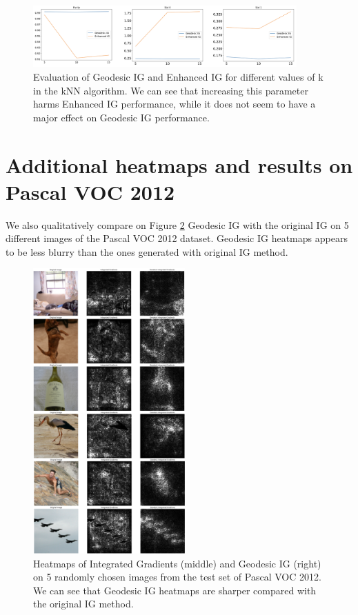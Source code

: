 \begin{figure}[ht]
\vskip 0.2in
\begin{center}
\centerline{\includegraphics[width=0.9\textwidth]{figures/knn.png}}
\caption{Evaluation of Geodesic IG and Enhanced IG for different values of k in the kNN algorithm. We can see that increasing this parameter harms Enhanced IG performance, while it does not seem to have a major effect on Geodesic IG performance.}
\label{fig:knn}
\end{center}
\vskip -0.2in
\end{figure}

\newpage

\section{Additional heatmaps and results on Pascal VOC 2012}
\label{app:voc}

We also qualitatively compare on Figure \ref{fig:more_images} Geodesic IG with the original IG on 5 different images of the Pascal VOC 2012 dataset. Geodesic IG heatmaps appears to be less blurry than the ones generated with original IG method.

\begin{figure}[ht]
\vskip 0.2in
\begin{center}
\centerline{\includegraphics[width=0.52\textwidth]{figures/more_images.png}}
\caption{Heatmaps of Integrated Gradients (middle) and Geodesic IG (right) on 5 randomly chosen images from the test set of Pascal VOC 2012. We can see that Geodesic IG heatmaps are sharper compared with the original IG method.}
\label{fig:more_images}
\end{center}
\vskip -0.2in
\end{figure}
